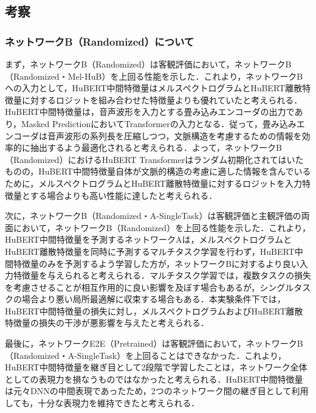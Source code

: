 \subsection{考察}
\subsubsection{ネットワークB（Randomized）について}
まず，ネットワークB（Randomized）は客観評価において，ネットワークB（Randomized・Mel-HuB）を上回る性能を示した．これより，ネットワークBへの入力として，HuBERT中間特徴量はメルスペクトログラムとHuBERT離散特徴量に対するロジットを組み合わせた特徴量よりも優れていたと考えられる．HuBERT中間特徴量は，音声波形を入力とする畳み込みエンコーダの出力であり，Masked PredictionにおいてTransformerの入力となる．従って，畳み込みエンコーダは音声波形の系列長を圧縮しつつ，文脈構造を考慮するための情報を効率的に抽出するよう最適化されると考えられる．よって，ネットワークB（Randomized）におけるHuBERT Transformerはランダム初期化されてはいたものの，HuBERT中間特徴量自体が文脈的構造の考慮に適した情報を含んでいるために，メルスペクトログラムとHuBERT離散特徴量に対するロジットを入力特徴量とする場合よりも高い性能に達したと考えられる．

次に，ネットワークB（Randomized・A-SingleTask）は客観評価と主観評価の両面において，ネットワークB（Randomized）を上回る性能を示した．これより，HuBERT中間特徴量を予測するネットワークAは，メルスペクトログラムとHuBERT離散特徴量を同時に予測するマルチタスク学習を行わず，HuBERT中間特徴量のみを予測するよう学習した方が，ネットワークBに対するより良い入力特徴量を与えられると考えられる．マルチタスク学習では，複数タスクの損失を考慮させることが相互作用的に良い影響を及ぼす場合もあるが，シングルタスクの場合より悪い局所最適解に収束する場合もある\cite{crawshaw2020multi}．本実験条件下では，HuBERT中間特徴量の損失に対し，メルスペクトログラムおよびHuBERT離散特徴量の損失の干渉が悪影響を与えたと考えられる．

最後に，ネットワークE2E（Pretrained）は客観評価において，ネットワークB（Randomized・A-SingleTask）を上回ることはできなかった．これより，HuBERT中間特徴量を継ぎ目として2段階で学習したことは，ネットワーク全体としての表現力を損なうものではなかったと考えられる．HuBERT中間特徴量は元々DNNの中間表現であったため，2つのネットワーク間の継ぎ目として利用しても，十分な表現力を維持できたと考えられる．

